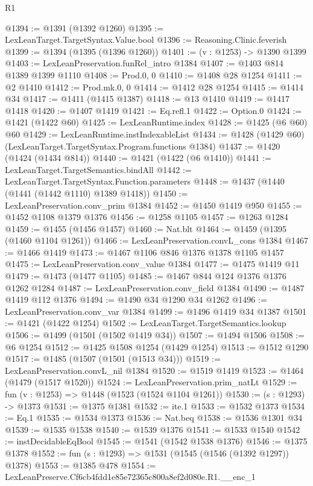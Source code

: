 \begin{lexlean}{R1}
\begin{coremodule}
@1394 := @1391 (@1392 @1260)
@1395 := LexLeanTarget.TargetSyntax.Value.bool
@1396 := Reasoning.Clinic.feverish
@1399 := @1394 (@1395 (@1396 @1260))
@1401 := (v : @1253) -> @1390 @1399
@1403 := LexLeanPreservation.funRel_intro @1384
@1407 := @1403 @814 @1389 @1399 @1110
@1408 := Prod.{0, 0}
@1410 := @1408 @28 @1254
@1411 := @2 @1410
@1412 := Prod.mk.{0, 0}
@1414 := @1412 @28 @1254
@1415 := @1414 @34
@1417 := @1411 (@1415 @1387)
@1418 := @13 @1410
@1419 := @1417 @1418
@1420 := @1407 @1419
@1421 := Eq.refl.{1}
@1422 := Option.{0}
@1424 := @1421 (@1422 @60)
@1425 := LexLeanRuntime.index
@1428 := @1425 (@6 @60) @60
@1429 := LexLeanRuntime.instIndexableList
@1434 := @1428 (@1429 @60) (LexLeanTarget.TargetSyntax.Program.functions @1384)
@1437 := @1420 (@1424 (@1434 @814))
@1440 := @1421 (@1422 (@6 @1410))
@1441 := LexLeanTarget.TargetSemantics.bindAll
@1442 := LexLeanTarget.TargetSyntax.Function.parameters
@1448 := @1437 (@1440 (@1441 (@1442 @1110) @1389 @1418))
@1450 := LexLeanPreservation.conv_prim @1384
@1452 := @1450 @1419 @950
@1455 := @1452 @1108 @1379 @1376
@1456 := @1258 @1105
@1457 := @1263 @1284
@1459 := @1455 (@1456 @1457)
@1460 := Nat.blt
@1464 := @1459 (@1395 (@1460 @1104 @1261))
@1466 := LexLeanPreservation.convL_cons @1384
@1467 := @1466 @1419
@1473 := @1467 @1106 @846 @1376 @1378 @1105 @1457
@1475 := LexLeanPreservation.conv_value @1384
@1477 := @1475 @1419 @11
@1479 := @1473 (@1477 @1105)
@1485 := @1467 @844 @124 @1376 @1376 @1262 @1284
@1487 := LexLeanPreservation.conv_field @1384
@1490 := @1487 @1419 @112 @1376
@1494 := @1490 @34 @1290 @34 @1262
@1496 := LexLeanPreservation.conv_var @1384
@1499 := @1496 @1419 @34 @1387
@1501 := @1421 (@1422 @1254)
@1502 := LexLeanTarget.TargetSemantics.lookup
@1506 := @1499 (@1501 (@1502 @1419 @34))
@1507 := @1494 @1506
@1508 := @6 @1254
@1512 := @1425 @1508 @1254 (@1429 @1254)
@1513 := @1512 @1290
@1517 := @1485 (@1507 (@1501 (@1513 @34)))
@1519 := LexLeanPreservation.convL_nil @1384
@1520 := @1519 @1419
@1523 := @1464 (@1479 (@1517 @1520))
@1524 := LexLeanPreservation.prim_natLt
@1529 := fun (v : @1253) => @1448 (@1523 (@1524 @1104 @1261))
@1530 := (s : @1293) -> @1373
@1531 := @1375 @1381
@1532 := ite.{1}
@1533 := @1532 @1373
@1534 := Eq.{1}
@1535 := @1534 @1373
@1536 := Nat.beq
@1538 := @1536 @1301 @34
@1539 := @1535 @1538
@1540 := @1539 @1376
@1541 := @1533 @1540
@1542 := instDecidableEqBool
@1545 := @1541 (@1542 @1538 @1376)
@1546 := @1375 @1378
@1552 := fun (s : @1293) => @1531 (@1545 (@1546 (@1392 @1297)) @1378)
@1553 := @1385 @478
@1554 := LexLeanPreserve.Cf6cb4fdd1e85e72365c800a8ef2d080e.R1.__enc_1

\end{coremodule}
\end{lexlean}

